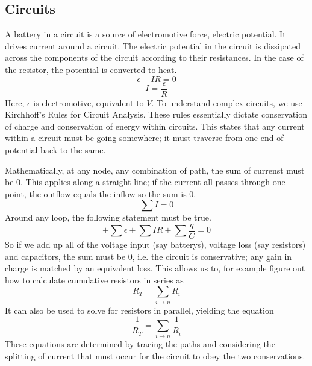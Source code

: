 \documentclass[12pt]{report}
\begin{document}
\begin{flushleft}
\subsection*{Circuits}

A battery in a circuit is a source of electromotive force, electric potential.
It drives current around a circuit. The electric potential in the circuit is
dissipated across the components of the circuit according to their resistances.
In the case of the resistor, the potential is converted to heat.
\[\epsilon - IR = 0\]
\[I = \frac{\epsilon}{R}\]
Here, \(\epsilon\) is electromotive, equivalent to \(V\). To understand complex
circuits, we use Kirchhoff's Rules for Circuit Analysis. These rules 
essentially dictate conservation of charge and conservation of energy within
circuits. This states that any current within a circuit must be going 
somewhere; it must traverse from one end of potential back to the same. \par
Mathematically, at any node, any combination of path, the sum of currenst must
be \(0\). This applies along a straight line; if the current all passes through
one point, the outflow equals the inflow so the sum is \(0\).
\[\sum I = 0\]
Around any loop, the following statement must be true.
\[\pm\sum\epsilon\pm\sum IR\pm\sum\frac{q}{C} = 0\]
So if we add up all of the voltage input (say batterys), voltage loss 
(say resistors) and capacitors, the sum must be \(0\), i.e. the circuit is
conservative; any gain in charge is matched by an equivalent loss. This
allows us to, for example figure out how to calculate cumulative resistors in
series as
\[R_T = \sum_{i\rightarrow n}R_i\]
It can also be used to solve for resistors in parallel, yielding the equation
\[\frac{1}{R_T} = \sum_{i\rightarrow n}\frac{1}{R_i}\]
These equations are determined by tracing the paths and considering the 
splitting of current that must occur for the circuit to obey the two 
conservations.

\end{flushleft}
\end{document}

